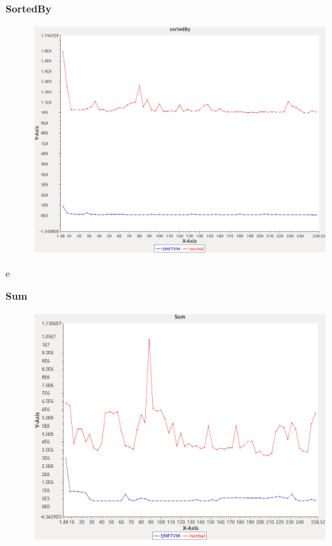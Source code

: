 \noindent\textbf{SortedBy}

\begin{figure}[h]
\centering
\includegraphics[width=\textwidth]{../graphs/bag/sortedBy}
\end{figure}e
\pagebreak

\noindent\textbf{Sum}

\begin{figure}[h]
\centering
\includegraphics[width=\textwidth]{../graphs/bag/Sum}
\end{figure}
\pagebreak
